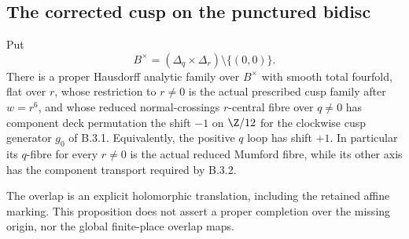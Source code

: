 \subsection{The corrected cusp on the punctured bidisc}

\begin{proposition}
\label{push:B418}
Put
\[
 B^\times=(\Delta_q\times\Delta_r)\setminus\{(0,0)\}.
\]
There is a proper Hausdorff analytic family over
$B^\times$ with smooth total fourfold, flat over $r$,
whose restriction to $r\ne0$ is the actual prescribed
cusp family after $w=r^6$, and whose reduced
normal-crossings $r$-central fibre over $q\ne0$ has
component deck permutation the shift $-1$ on $\Z/12$
for the clockwise cusp generator $g_0$ of B.3.1.
Equivalently, the positive $q$ loop has shift $+1$.
In particular its $q$-fibre for every $r\ne0$ is the
actual reduced Mumford fibre, while its other axis has
the component transport required by B.3.2.

The overlap is an explicit holomorphic translation,
including the retained affine marking. This proposition
does not assert a proper completion over the missing
origin, nor the global finite-place overlap maps.
\end{proposition}

